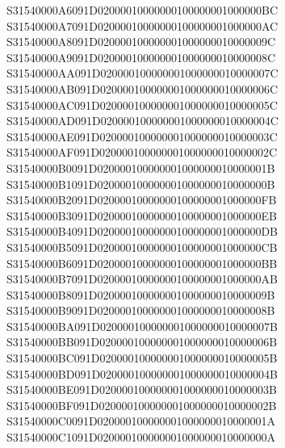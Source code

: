 \documentclass[12pt,a4paper]{article}
\begin{document}
\begin{framed}
{S31540000A6091D02000010000000100000001000000BC\newline
S31540000A7091D02000010000000100000001000000AC\newline
S31540000A8091D020000100000001000000010000009C\newline
S31540000A9091D020000100000001000000010000008C\newline
S31540000AA091D020000100000001000000010000007C\newline
S31540000AB091D020000100000001000000010000006C\newline
S31540000AC091D020000100000001000000010000005C\newline
S31540000AD091D020000100000001000000010000004C\newline
S31540000AE091D020000100000001000000010000003C\newline
S31540000AF091D020000100000001000000010000002C\newline
S31540000B0091D020000100000001000000010000001B\newline
S31540000B1091D020000100000001000000010000000B\newline
S31540000B2091D02000010000000100000001000000FB\newline
S31540000B3091D02000010000000100000001000000EB\newline
S31540000B4091D02000010000000100000001000000DB\newline
S31540000B5091D02000010000000100000001000000CB\newline
S31540000B6091D02000010000000100000001000000BB\newline
S31540000B7091D02000010000000100000001000000AB\newline
S31540000B8091D020000100000001000000010000009B\newline
S31540000B9091D020000100000001000000010000008B\newline
S31540000BA091D020000100000001000000010000007B\newline
S31540000BB091D020000100000001000000010000006B\newline
S31540000BC091D020000100000001000000010000005B\newline
S31540000BD091D020000100000001000000010000004B\newline
S31540000BE091D020000100000001000000010000003B\newline
S31540000BF091D020000100000001000000010000002B\newline
S31540000C0091D020000100000001000000010000001A\newline
S31540000C1091D020000100000001000000010000000A\newline
}
\end{framed}
\end{document}
